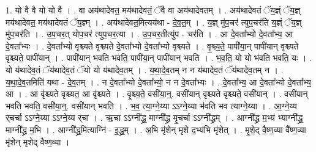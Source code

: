 \documentclass[17pt]{extarticle}
\begin{document}
1. यो वै वै यो यो वै । . वा अय॑थादेवत॒ मय॑थादेवतं॒ ॅवै वा अय॑थादेवतम् । . अय॑थादेवतं ॅय॒ज्ञ्ं ॅय॒ज्ञ् मय॑थादेवत॒ मय॑थादेवतं ॅय॒ज्ञ्म् । . अय॑थादेवत॒मित्यय॑था - दे॒व॒त॒म् । . य॒ज्ञ् मु॑प॒चर॑ त्युप॒चर॑ति य॒ज्ञ्ं ॅय॒ज्ञ् मु॑प॒चर॑ति । . उ॒प॒चर॒त् योप॒चर॑ त्युप॒चर॒त्या । . उ॒प॒चर॒तीत्यु॑प - चर॑ति । . आ दे॒वता᳚भ्यो दे॒वता᳚भ्य॒ आ दे॒वता᳚भ्यः । . दे॒वता᳚भ्यो वृश्च्यते वृश्च्यते दे॒वता᳚भ्यो दे॒वता᳚भ्यो वृश्च्यते । . वृ॒श्च्य॒ते॒ पापी॑या॒न् पापी॑यान् वृश्च्यते वृश्च्यते॒ पापी॑यान् । . पापी॑यान् भवति भवति॒ पापी॑या॒न् पापी॑यान् भवति । . भ॒व॒ति॒ यो यो भ॑वति भवति॒ यः । . यो य॑थादेव॒तं ॅय॑थादेव॒तं ॅयो यो य॑थादेव॒तम् । . य॒था॒दे॒व॒तम् न न य॑थादेव॒तं ॅय॑थादेव॒तम् न । . य॒था॒दे॒व॒तमिति॑ यथा - दे॒व॒तम् । . न दे॒वता᳚भ्यो दे॒वता᳚भ्यो॒ न न दे॒वता᳚भ्यः । . दे॒वता᳚भ्य॒ आ दे॒वता᳚भ्यो दे॒वता᳚भ्य॒ आ । . आ वृ॑श्च्यते वृश्च्यत॒ आ वृ॑श्च्यते । . वृ॒श्च्य॒ते॒ वसी॑या॒न्॒. वसी॑यान् वृश्च्यते वृश्च्यते॒ वसी॑यान् । . वसी॑यान् भवति भवति॒ वसी॑या॒न्॒. वसी॑यान् भवति । . भ॒व॒ त्या॒ग्ने॒य्या ऽऽग्ने॒य्या भ॑वति भव त्याग्ने॒य्या । . आ॒ग्ने॒य्य र्‌चर्चा ऽऽग्ने॒य्या ऽऽग्ने॒य्य र्‌चा । . ऋ॒चा ऽऽग्नी᳚द्ध्र॒ माग्नी᳚द्ध्र मृ॒चर्चा ऽऽग्नी᳚द्ध्रम् । . आग्नी᳚द्ध्र म॒भ्य॑ भ्याग्नी᳚द्ध्र॒ माग्नी᳚द्ध्र म॒भि । . आग्नी᳚द्ध्र॒मित्याग्नि॑ - इ॒द्ध्र॒म् । . अ॒भि मृ॑शेन् मृशे द॒भ्य॑भि मृ॑शेत् । . मृ॒शे॒द् वै॒ष्ण॒व्या वै᳚ष्ण॒व्या मृ॑शेन् मृशेद् वैष्ण॒व्या । \newline
\end{document}
